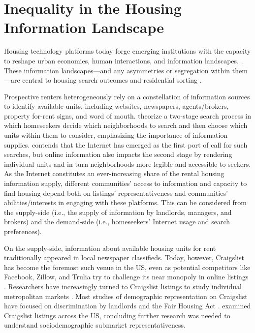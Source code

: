\documentclass[11pt,letterpaper]{article}
\begin{document}
\section{Inequality in the Housing Information Landscape}

Housing technology platforms today forge emerging institutions with the capacity to reshape urban economies, human interactions, and information landscapes. \citep{wegmann_taming_2017,shaw_platform_2018,kim_planning_2019,fields_automated_2019,jiao_cities_2019}. These information landscapes---and any asymmetries or segregation within them---are central to housing search outcomes and residential sorting \citep{levitt_market_2008,kurlat_testing_2015,garmaise_confronting_2004,metzger_step_2019,ben-shahar_improved_2019}.

Prospective renters heterogeneously rely on a constellation of information sources to identify available units, including websites, newspapers, agents/brokers, property for-rent signs, and word of mouth. \citet{krysan_cycle_2017} theorize a two-stage search process in which homeseekers decide which neighborhoods to search and then choose which units within them to consider, emphasizing the importance of information supplies. \citet{rae_online_2015} contends that the Internet has emerged as the first port of call for such searches, but online information also impacts the second stage by rendering individual units and in turn neighborhoods more legible and accessible to seekers. As the Internet constitutes an ever-increasing share of the rental housing information supply, different communities' access to information and capacity to find housing depend both on listings' representativeness and communities' abilities/interests in engaging with these platforms. This can be considered from the supply-side (i.e., the supply of information by landlords, managers, and brokers) and the demand-side (i.e., homeseekers' Internet usage and search preferences).

On the supply-side, information about available housing units for rent traditionally appeared in local newspaper classifieds. Today, however, Craigslist has become the foremost such venue in the US, even as potential competitors like Facebook, Zillow, and Trulia try to challenge its near monopoly in online listings \citep{hau_newspaper_2006,brown_rental_2014,seamans_responses_2014,kroft_does_2014,yurieff_facebook_2017}. Researchers have increasingly turned to Craigslist listings to study individual metropolitan markets \citep[e.g.,][]{besbris_language_2018,brown_converting_2017,im_energy_2017,halket_homeownership_2015,mallach_meeting_2010,palm_scale_2018,schachter_immigration_2017,wegmann_understanding_2012}. Most studies of demographic representation on Craigslist have focused on discrimination by landlords \citep[e.g.,][]{hanson_field_2014,carlsson_discrimination_2014,evans_examining_2018,murchie_rental_2018} and the Fair Housing Act \citep[e.g.,][]{larkin_criminal_2010,oliveri_discriminatory_2010}. \citet{boeing_new_2017} examined Craigslist listings across the US, concluding further research was needed to understand sociodemographic submarket representativeness.
\end{document}
